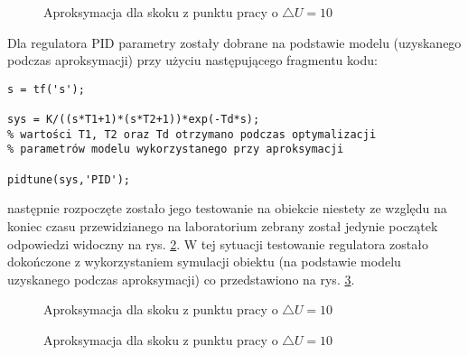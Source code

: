 \begin{figure}[ht]
\centering

\caption{Aproksymacja dla skoku z punktu pracy o $\triangle U = 10$}
\label{R5}
\end{figure}
Dla regulatora PID parametry zostały dobrane na podstawie modelu (uzyskanego podczas aproksymacji) przy użyciu następującego fragmentu kodu:

\begin{lstlisting}[style=Matlab-editor]
s = tf('s');

sys = K/((s*T1+1)*(s*T2+1))*exp(-Td*s);
% wartości T1, T2 oraz Td otrzymano podczas optymalizacji
% parametrów modelu wykorzystanego przy aproksymacji

pidtune(sys,'PID');
\end{lstlisting} 

następnie rozpoczęte zostało jego testowanie na obiekcie niestety ze względu na koniec czasu przewidzianego na laboratorium zebrany został jedynie początek odpowiedzi widoczny na rys. \ref{R6}. W tej sytuacji testowanie regulatora zostało dokończone z wykorzystaniem symulacji obiektu (na podstawie modelu uzyskanego podczas aproksymacji) co przedstawiono na rys. \ref{R7}.

\begin{figure}[ht]
\centering

\caption{Aproksymacja dla skoku z punktu pracy o $\triangle U = 10$}
\label{R6}
\end{figure}

\begin{figure}[ht]
\centering

\caption{Aproksymacja dla skoku z punktu pracy o $\triangle U = 10$}
\label{R7}
\end{figure}
